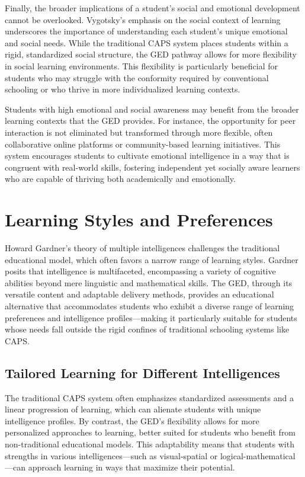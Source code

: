 \documentclass[12pt]{article}
\begin{document}
Finally, the broader implications of a student's social and emotional development cannot be overlooked. Vygotsky's emphasis on the social context of learning underscores the importance of understanding each student's unique emotional and social needs. While the traditional CAPS system places students within a rigid, standardized social structure, the GED pathway allows for more flexibility in social learning environments. This flexibility is particularly beneficial for students who may struggle with the conformity required by conventional schooling or who thrive in more individualized learning contexts.

Students with high emotional and social awareness may benefit from the broader learning contexts that the GED provides. For instance, the opportunity for peer interaction is not eliminated but transformed through more flexible, often collaborative online platforms or community-based learning initiatives. This system encourages students to cultivate emotional intelligence in a way that is congruent with real-world skills, fostering independent yet socially aware learners who are capable of thriving both academically and emotionally.

\section{Learning Styles and Preferences}

Howard Gardner’s theory of multiple intelligences challenges the traditional educational model, which often favors a narrow range of learning styles. Gardner posits that intelligence is multifaceted, encompassing a variety of cognitive abilities beyond mere linguistic and mathematical skills. The GED, through its versatile content and adaptable delivery methods, provides an educational alternative that accommodates students who exhibit a diverse range of learning preferences and intelligence profiles—making it particularly suitable for students whose needs fall outside the rigid confines of traditional schooling systems like CAPS.

\subsection{Tailored Learning for Different Intelligences}

The traditional CAPS system often emphasizes standardized assessments and a linear progression of learning, which can alienate students with unique intelligence profiles. By contrast, the GED’s flexibility allows for more personalized approaches to learning, better suited for students who benefit from non-traditional educational models. This adaptability means that students with strengths in various intelligences—such as visual-spatial or logical-mathematical—can approach learning in ways that maximize their potential.
\end{document}
